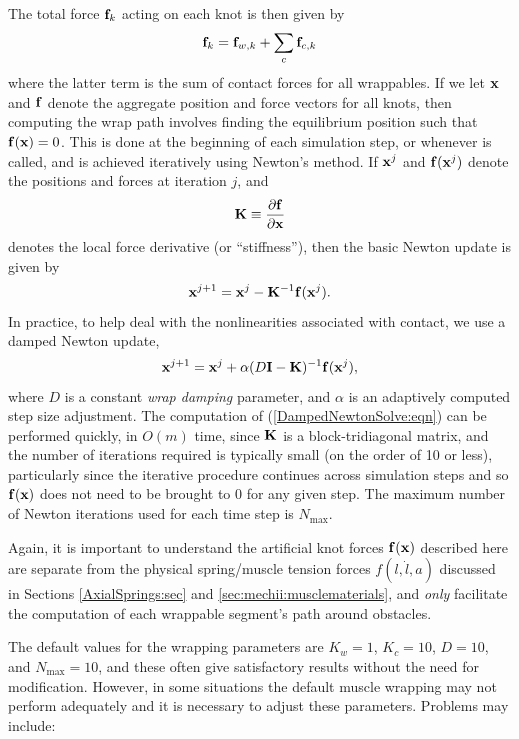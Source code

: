 The total force ${\bf f}_k$ acting on each knot is then given by
%
\begin{equation*}
{\bf f}_k = {\bf f}_{w,k} + \sum_c {\bf f}_{c,k}
\end{equation*}
%
where the latter term is the sum of contact forces for all wrappables.
If we let ${\bf x}$ and ${\bf f}$ denote the aggregate position and force vectors
for all knots, then computing the wrap path involves finding the
equilibrium position such that ${\bf f}({\bf x}) = 0$. This is done at the
beginning of each simulation step, or whenever  is called, and
is achieved iteratively using Newton's method.
If ${\bf x}^j$ and ${\bf f}({\bf x}^j)$ denote the positions and forces at iteration $j$, 
and
%
\begin{equation*}
{\bf K} \equiv \frac{\partial {\bf f}}{\partial {\bf x}}
\end{equation*}
%
denotes the local force derivative (or ``stiffness''), then the basic
Newton update is given by
%
\begin{equation*}
{\bf x}^{j+1} = {\bf x}^j - {\bf K}^{-1} {\bf f}({\bf x}^j).
\label{NewtonSolve:eqn}
\end{equation*}
%
In practice, to help deal with the nonlinearities associated with
contact, we use a damped Newton update,
%
\begin{equation}
{\bf x}^{j+1} = {\bf x}^j + \alpha (D {\bf I} - {\bf K})^{-1} {\bf f}({\bf x}^j),
\label{DampedNewtonSolve:eqn}
\end{equation}
%
where $D$ is a constant {\it wrap damping} parameter, and $\alpha$ is
an adaptively computed step size adjustment. The computation of
(\ref{DampedNewtonSolve:eqn}) can be performed quickly, in $O(m)$
time, since ${\bf K}$ is a block-tridiagonal matrix, and the number of
iterations required is typically small (on the order of 10 or less),
particularly since the iterative procedure continues across simulation
steps and so ${\bf f}({\bf x})$ does not need to be brought to $0$ for any given
step. The maximum number of Newton iterations used for each
time step is $N_\text{max}$.

\begin{sideblock}
Again, it is important to understand the artificial knot forces
${\bf f}({\bf x})$ described here are separate from the physical spring/muscle
tension forces $f(l,\dot l, a)$ discussed in Sections
\ref{AxialSprings:sec} and \ref{sec:mechii:musclematerials}, and {\it
only} facilitate the computation of each wrappable segment's path
around obstacles.
\end{sideblock}

The default values for the wrapping parameters are $K_w = 1$, $K_c =
10$, $D = 10$, and $N_\text{max} = 10$, and these often give
satisfactory results without the need for modification.  However, in
some situations the default muscle wrapping may not perform adequately
and it is necessary to adjust these parameters. Problems may include:


